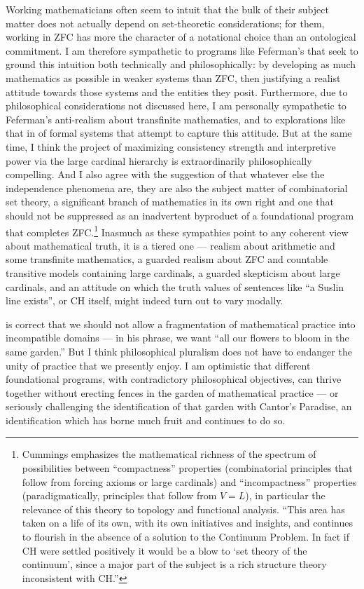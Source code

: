 \documentclass[letterpaper,12pt]{article}
\begin{document}
Working mathematicians often seem to intuit that the bulk of their subject matter does not actually depend on set-theoretic considerations; for them, working in ZFC has more the character of a notational choice than an ontological commitment. I am therefore sympathetic to programs like Feferman's \citeyearpar{feferman1992little} that seek to ground this intuition both technically and philosophically: by developing as much mathematics as possible in weaker systems than ZFC, then justifying a realist attitude towards those systems and the entities they posit. Furthermore, due to philosophical considerations not discussed here, I am personally sympathetic to Feferman's anti-realism about transfinite mathematics, and to explorations like that in \cite{Rathjen2016-RATIIS} of formal systems that attempt to capture this attitude. But at the same time, I think the project of maximizing consistency strength and interpretive power via the large cardinal hierarchy is extraordinarily philosophically compelling. And I also agree with the suggestion of \cite{cummings2012challenges} that whatever else the independence phenomena are, they are also the subject matter of combinatorial set theory, a significant branch of mathematics in its own right and one that should not be suppressed as an inadvertent byproduct of a foundational program that completes ZFC.\footnote{Cummings emphasizes the mathematical richness of the spectrum of possibilities between ``compactness'' properties (combinatorial principles that follow from forcing axioms or large cardinals) and ``incompactness'' properties (paradigmatically, principles that follow from $V = L$), in particular the relevance of this theory to topology and functional analysis. ``This area has taken on a life of its own, with its own initiatives and insights, and continues to flourish in the absence of a solution to the Continuum Problem. In fact if CH were settled positively it would be a blow to `set theory of the continuum', since a major part of the subject is a rich structure theory inconsistent with CH.''} Inasmuch as these sympathies point to any coherent view about mathematical truth, it is a tiered one --- realism about arithmetic and some transfinite mathematics, a guarded realism about ZFC and countable transitive models containing large cardinals, a guarded skepticism about large cardinals, and an attitude on which the truth values of sentences like ``a Suslin line exists'', or CH itself, might indeed turn out to vary modally.

\cite{steel2012godel} is correct that we should not allow a fragmentation of mathematical practice into incompatible domains --- in his phrase, we want ``all our flowers to bloom in the same garden.'' But I think philosophical pluralism does not have to endanger the unity of practice that we presently enjoy. I am optimistic that different foundational programs, with contradictory philosophical objectives, can thrive together without erecting fences in the garden of mathematical practice --- or seriously challenging the identification of that garden with Cantor's Paradise, an identification which has borne much fruit and continues to do so.
\end{document}
